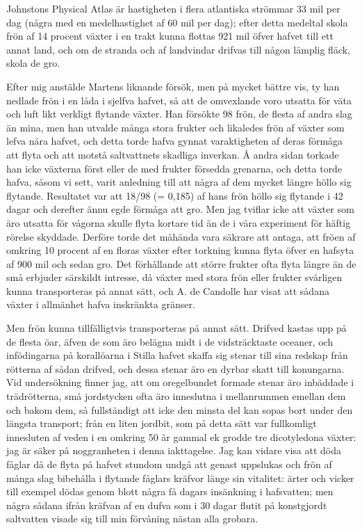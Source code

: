 Johnstons Physical Atlas är hastigheten i flera atlantiska strömmar 33 mil per dag (några med en medelhastighet af 60 mil per dag); efter detta medeltal skola frön af 14 procent växter i en trakt kunna flottas 921 mil öfver hafvet till ett annat land, och om de stranda och af landvindar drifvas till någon lämplig fläck, skola de gro.

Efter mig anstälde Martens liknande försök, men på mycket bättre vis, ty han nedlade frön i en låda i sjelfva hafvet, så att de omvexlande voro utsatta för väta och luft likt verkligt flytande växter. Han försökte 98 frön, de flesta af andra slag än mina, men han utvalde många stora frukter och likaledes frön af växter som lefva nära hafvet, och detta torde hafva gynnat varaktigheten af deras förmåga att flyta och att motstå saltvattnets skadliga inverkan. Å andra sidan torkade han icke växterna först eller de med frukter försedda grenarna, och detta torde hafva, såsom vi sett, varit anledning till att några af dem mycket längre höllo sig flytande. Resultatet var att 18/98 (= 0,185) af hans frön höllo sig flytande i 42 dagar och derefter ännu egde förmåga att gro. Men jag tviflar icke att växter som äro utsatta för vågorna skulle flyta kortare tid än de i våra experiment för häftig rörelse skyddade. Derföre torde det måhända vara säkrare att antaga, att fröen af omkring 10 procent af en floras växter efter torkning kunna flyta öfver en hafsyta af 900 mil och sedan gro. Det förhållande att större frukter ofta flyta längre än de små erbjuder särskildt intresse, då växter med stora frön eller frukter svårligen kunna transporteras på annat sätt, och A. de Candolle har visat att sådana växter i allmänhet hafva inskränkta gränser.

Men frön kunna tillfälligtvis transporteras på annat sätt. Drifved kastas upp på de flesta öar, äfven de som äro belägna midt i de vidsträcktaste oceaner, och infödingarna på korallöarna i Stilla hafvet skaffa sig stenar till sina redskap från rötterna af sådan drifved, och dessa stenar äro en dyrbar skatt till konungarna. Vid undersökning finner jag, att om oregelbundet formade stenar äro inbäddade i trädrötterna, små jordstycken ofta äro inneslutna i mellanrummen emellan dem och bakom dem, så fullständigt att icke den minsta del kan sopas bort under den längsta transport; från en liten jordbit, som på detta sätt var fullkomligt innesluten af veden i en omkring 50 år gammal ek grodde tre dicotyledona växter: jag är säker på noggranheten i denna iakttagelse. Jag kan vidare visa att döda fåglar då de flyta på hafvet stundom undgå att genast uppslukas och frön af många slag bibehålla i flytande fåglars kräfvor länge sin vitalitet: ärter och vicker till exempel dödas genom blott några få dagars insänkning i hafsvatten; men några sådana ifrån kräfvan af en dufva som i 30 dagar flutit på konstgjordt saltvatten visade sig till min förvåning nästan alla grobara.

